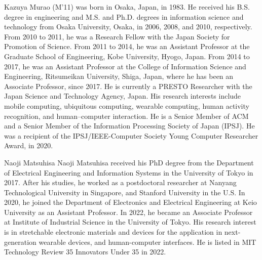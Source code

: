 \documentclass{ieeeaccess}
\begin{document}
 \begin{IEEEbiography}{Kazuya Murao} (M'11) was born in Osaka, Japan, in 1983. He received his B.S. degree in engineering and M.S. and Ph.D. degrees in information science and technology from Osaka University, Osaka, in 2006, 2008, and 2010, respectively. From 2010 to 2011, he was a Research Fellow with the Japan Society for Promotion of Science. From 2011 to 2014, he was an Assistant Professor at the Graduate School of Engineering, Kobe University, Hyogo, Japan. From 2014 to 2017, he was an Assistant Professor at the College of Information Science and Engineering, Ritsumeikan University, Shiga, Japan, where he has been an Associate Professor, since 2017. He is currently a PRESTO Researcher with the Japan Science and Technology Agency, Japan. His research interests include mobile computing, ubiquitous computing, wearable computing, human activity recognition, and human–computer interaction. He is a Senior Member of ACM and a Senior Member of the Information Processing Society of Japan (IPSJ). He was a recipient of the IPSJ/IEEE-Computer Society Young Computer Researcher Award, in 2020.
 \end{IEEEbiography}

 \begin{IEEEbiography}{Naoji Matsuhisa} Naoji Matsuhisa received his PhD degree from the Department of Electrical Engineering and Information Systems in the University of Tokyo in 2017. After his studies, he worked as a postdoctoral researcher at Nanyang Technological University in Singapore, and Stanford University in the U.S. In 2020, he joined the Department of Electronics and Electrical Engineering at Keio University as an Assistant Professor. In 2022, he became an Associate Professor at Institute of Industrial Science in the University of Tokyo. His research interest is in stretchable electronic materials and devices for the application in next-generation wearable devices, and human-computer interfaces. He is listed in MIT Technology Review 35 Innovators Under 35 in 2022.
 \end{IEEEbiography}


\EOD
\end{document}
